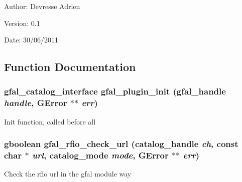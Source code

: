 \begin{Desc}
\item[Author:]Devresse Adrien \end{Desc}
\begin{Desc}
\item[Version:]0.1 \end{Desc}
\begin{Desc}
\item[Date:]30/06/2011 \end{Desc}


\subsection{Function Documentation}
\subsubsection{\setlength{\rightskip}{0pt plus 5cm}gfal\_\-catalog\_\-interface gfal\_\-plugin\_\-init (gfal\_\-handle {\em handle}, GError $\ast$$\ast$ {\em err})}\label{gfal__rfio__plugin__main_8c_5c9edde4d67d96432a319d940a4799f1}


Init function, called before all 
\subsubsection{\setlength{\rightskip}{0pt plus 5cm}gboolean gfal\_\-rfio\_\-check\_\-url (catalog\_\-handle {\em ch}, const char $\ast$ {\em url}, catalog\_\-mode {\em mode}, GError $\ast$$\ast$ {\em err})}\label{gfal__rfio__plugin__main_8c_4ccb47b2adefd1e120cf7bc297c7ddc6}


Check the rfio url in the gfal module way 